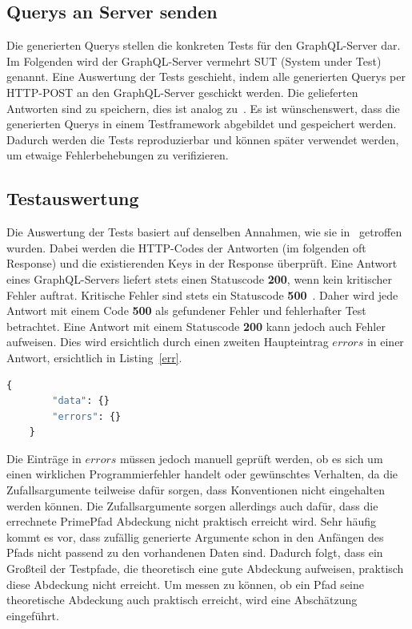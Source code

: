 \subsection{Querys an Server senden}
\label{testf}

Die generierten Querys stellen die konkreten Tests für den GraphQL-Server dar.
Im Folgenden wird der GraphQL-Server vermehrt SUT (System under Test) genannt.
Eine Auswertung der Tests geschieht, indem alle generierten Querys per HTTP-POST an den GraphQL-Server geschickt werden.
Die gelieferten Antworten sind zu speichern, dies ist analog zu~\cite{property-based-testing}.
Es ist wünschenswert, dass die generierten Querys in einem Testframework abgebildet und gespeichert werden.
Dadurch werden die Tests reproduzierbar und können später verwendet werden, um etwaige Fehlerbehebungen zu verifizieren.

\subsection{Testauswertung}

Die Auswertung der Tests basiert auf denselben Annahmen, wie sie in~\cite{property-based-testing} getroffen wurden.
Dabei werden die HTTP-Codes der Antworten (im folgenden oft Response) und die existierenden Keys in der Response überprüft.
Eine Antwort eines GraphQL-Servers liefert stets einen Statuscode \textbf{200}, wenn kein kritischer Fehler auftrat.
Kritische Fehler sind stets ein Statuscode \textbf{500}~\cite[vgl. 7. Response]{graphqlspecification}.
Daher wird jede Antwort mit einem Code \textbf{500} als gefundener Fehler und fehlerhafter Test betrachtet.
Eine Antwort mit einem Statuscode \textbf{200} kann jedoch auch Fehler aufweisen.
Dies wird ersichtlich durch einen zweiten Haupteintrag $errors$ in einer Antwort, ersichtlich in Listing~\ref{err}.

\begin{lstlisting}[language=GraphQL, label={err}, caption={fehlerhafte Antwort}]
    {
        "data": {}
        "errors": {}
    }
\end{lstlisting}

Die Einträge in $errors$ müssen jedoch manuell geprüft werden, ob es sich um einen wirklichen Programmierfehler handelt oder gewünschtes Verhalten,
da die Zufallsargumente teilweise dafür sorgen, dass Konventionen nicht eingehalten werden können.
Die Zufallsargumente sorgen allerdings auch dafür, dass die errechnete PrimePfad Abdeckung nicht praktisch erreicht wird.
Sehr häufig kommt es vor, dass zufällig generierte Argumente schon in den Anfängen des Pfads nicht passend zu den vorhandenen Daten sind.
Dadurch folgt, dass ein Großteil der Testpfade, die theoretisch eine gute Abdeckung aufweisen, praktisch diese Abdeckung nicht erreicht.
Um messen zu können, ob ein Pfad seine theoretische Abdeckung auch praktisch erreicht, wird eine Abschätzung eingeführt.

